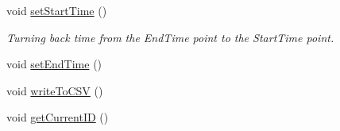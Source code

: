 \begin{DoxyCompactItemize}
\item 
void \hyperlink{class_website_score_handling_a5a59688924f563e984ccb473c7d3822c}{set\+Start\+Time} ()
\begin{DoxyCompactList}\small\item\em Turning back time from the End\+Time point to the Start\+Time point. \end{DoxyCompactList}\item 
void \hyperlink{class_website_score_handling_a36ce4afc4265f6671e28f81719a8628c}{set\+End\+Time} ()
\item 
void \hyperlink{class_website_score_handling_a443e910d91eae4e4325eb5ec714e09aa}{write\+To\+C\+SV} ()
\item 
void \hyperlink{class_website_score_handling_a973228f0341e39ce97c013707260b08c}{get\+Current\+ID} ()
\end{DoxyCompactItemize}
